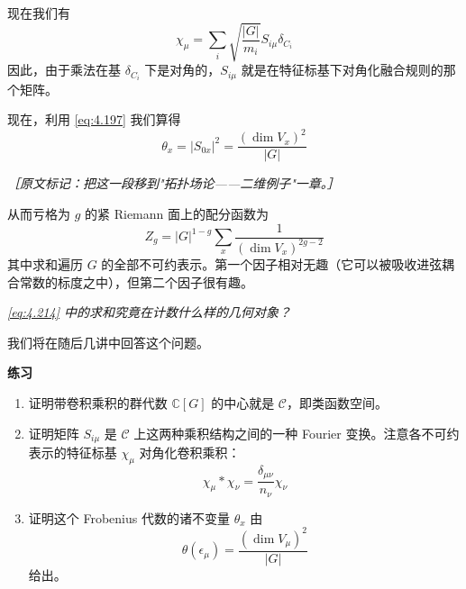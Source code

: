 现在我们有
\begin{equation}
  \chi_\mu=\sum_i\sqrt{\frac{|G|}{m_i}}S_{i\mu}\delta_{C_i}
  \tag{4.212}
  \label{eq:4.212}
\end{equation}
因此，由于乘法在基 $\delta_{C_i}$ 下是对角的，$S_{i\mu}$ 就是在特征标基下对角化融合规则的那个矩阵。

现在，利用 \eqref{eq:4.197} 我们算得
\begin{equation}
  \theta_x=|S_{0x}|^2=\frac{(\dim V_x)^2}{|G|}
  \tag{4.213}
  \label{eq:4.213}
\end{equation}

{\small\itshape ［原文标记：把这一段移到"拓扑场论——二维例子"一章。］}

从而亏格为 $g$ 的紧 Riemann 面上的配分函数为
\begin{equation}
  Z_g=|G|^{1-g}\sum_x\frac{1}{(\dim V_x)^{2g-2}}
  \tag{4.214}
  \label{eq:4.214}
\end{equation}
其中求和遍历 $G$ 的全部不可约表示。第一个因子相对无趣（它可以被吸收进弦耦合常数的标度之中），但第二个因子很有趣。

\emph{\eqref{eq:4.214} 中的求和究竟在计数什么样的几何对象？}

我们将在随后几讲中回答这个问题。


\textbf{练习}
\begin{enumerate}[label=\alph*.)]
  \item 证明带卷积乘积的群代数 $\mathbb{C}[G]$ 的中心就是 $\mathcal{C}$，即类函数空间。
  \item 证明矩阵 $S_{i\mu}$ 是 $\mathcal{C}$ 上这两种乘积结构之间的一种 Fourier 变换。注意各不可约表示的特征标基 $\chi_\mu$ 对角化卷积乘积：
  \begin{equation}
    \chi_\mu*\chi_\nu=\frac{\delta_{\mu\nu}}{n_\nu}\chi_\nu
    \tag{4.215}
    \label{eq:4.215}
  \end{equation}
  \item 证明这个 Frobenius 代数的诸不变量 $\theta_x$ 由
  \begin{equation}
    \theta(\epsilon_\mu)=\frac{(\dim V_\mu)^2}{|G|}
    \tag{4.216}
    \label{eq:4.216}
  \end{equation}
  给出。
\end{enumerate}

